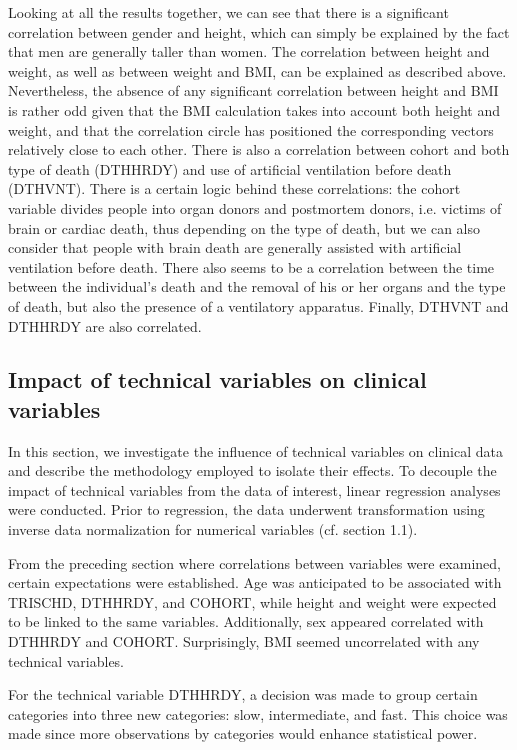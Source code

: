 \documentclass[a4paper, 11pt]{article}
\begin{document}
\begin{multicols}{2}
Looking at all the results together, we can see that there is a significant correlation between gender and height, which can simply be explained by the fact that men are generally taller than women. The correlation between height and weight, as well as between weight and BMI, can be explained as described above. Nevertheless, the absence of any significant correlation between height and BMI is rather odd given that the BMI calculation takes into account both height and weight, and that the correlation circle has positioned the corresponding vectors relatively close to each other. There is also a correlation between cohort and both type of death (DTHHRDY) and use of artificial ventilation before death (DTHVNT). There is a certain logic behind these correlations: the cohort variable divides people into organ donors and postmortem donors, i.e. victims of brain or cardiac death, thus depending on the type of death, but we can also consider that people with brain death are generally assisted with artificial ventilation before death. There also seems to be a correlation between the time between the individual's death and the removal of his or her organs and the type of death, but also the presence of a ventilatory apparatus. Finally, DTHVNT and DTHHRDY are also correlated.

\subsection{Impact of technical variables on clinical variables}

In this section, we investigate the influence of technical variables on clinical data and describe the methodology employed to isolate their effects.
To decouple the impact of technical variables from the data of interest, linear regression analyses were conducted.
Prior to regression, the data underwent transformation using inverse data normalization for numerical variables (cf. section 1.1).

From the preceding section where correlations between variables were examined, certain expectations were established.
Age was anticipated to be associated with TRISCHD, DTHHRDY, and COHORT, while height and weight were expected to be linked to the same variables.
Additionally, sex appeared correlated with DTHHRDY and COHORT. Surprisingly, BMI seemed uncorrelated with any technical variables.

For the technical variable DTHHRDY, a decision was made to group certain categories into three new categories: slow, intermediate, and fast.
This choice was made since more observations by categories would enhance statistical power.


\end{multicols}
\end{document}

